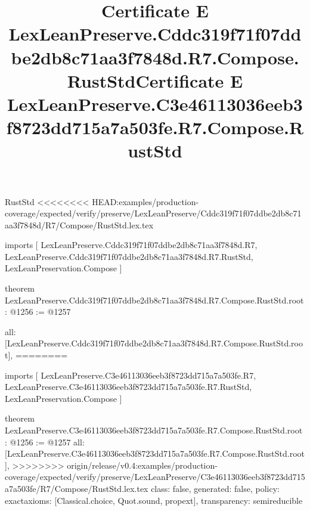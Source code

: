 \begin{lexlean}{RustStd}
<<<<<<<< HEAD:examples/production-coverage/expected/verify/preserve/LexLeanPreserve/Cddc319f71f07ddbe2db8c71aa3f7848d/R7/Compose/RustStd.lex.tex
\title{Certificate E LexLeanPreserve.Cddc319f71f07ddbe2db8c71aa3f7848d.R7.Compose.RustStd}
\begin{coremodule}
imports [
  LexLeanPreserve.Cddc319f71f07ddbe2db8c71aa3f7848d.R7,
  LexLeanPreserve.Cddc319f71f07ddbe2db8c71aa3f7848d.R7.RustStd,
  LexLeanPreservation.Compose
]

theorem LexLeanPreserve.Cddc319f71f07ddbe2db8c71aa3f7848d.R7.Compose.RustStd.root : @1256 := @1257 {
  all: [LexLeanPreserve.Cddc319f71f07ddbe2db8c71aa3f7848d.R7.Compose.RustStd.root],
========
\title{Certificate E LexLeanPreserve.C3e46113036eeb3f8723dd715a7a503fe.R7.Compose.RustStd}
\begin{coremodule}
imports [
  LexLeanPreserve.C3e46113036eeb3f8723dd715a7a503fe.R7,
  LexLeanPreserve.C3e46113036eeb3f8723dd715a7a503fe.R7.RustStd,
  LexLeanPreservation.Compose
]

theorem LexLeanPreserve.C3e46113036eeb3f8723dd715a7a503fe.R7.Compose.RustStd.root : @1256 := @1257 {
  all: [LexLeanPreserve.C3e46113036eeb3f8723dd715a7a503fe.R7.Compose.RustStd.root],
>>>>>>>> origin/release/v0.4:examples/production-coverage/expected/verify/preserve/LexLeanPreserve/C3e46113036eeb3f8723dd715a7a503fe/R7/Compose/RustStd.lex.tex
  class: false,
  generated: false,
  policy: exact{axioms: [Classical.choice, Quot.sound, propext]},
  transparency: semireducible
}


\end{coremodule}}
\end{coremodule}
\end{lexlean}
